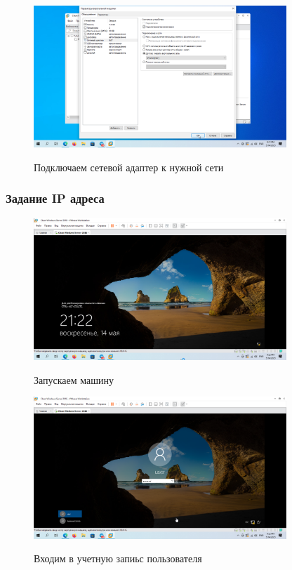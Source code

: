 \documentclass[a4paper]{article}
\begin{document}
  \begin{figure}[H]
    \centering
    \includegraphics[width=0.85\textwidth]{5_0010}
    \label{img:10}
    \caption{Подключаем сетевой адаптер к нужной сети}
  \end{figure}

  \subsubsection{Задание IP адреса}
  
  \begin{figure}[H]
    \centering
    \includegraphics[width=0.85\textwidth]{5_0011}
    \label{img:11}
    \caption{Запускаем машину}
  \end{figure}

  \begin{figure}[H]
    \centering
    \includegraphics[width=0.85\textwidth]{5_0012}
    \label{img:12}
    \caption{Входим в учетную запиьс пользователя}
  \end{figure}
\end{document}
